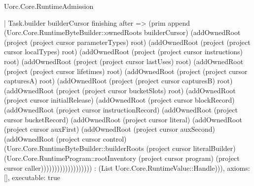 \begin{lexlean}{Uorc.Core.RuntimeAdmission}
\begin{semanticmodule}
{    | Task.builder builderCursor finishing after => (prim append (Uorc.Core.RuntimeByteBuilder::ownedRoots builderCursor) (addOwnedRoot (project (project cursor parameterTypes) root) (addOwnedRoot (project (project cursor localTypes) root) (addOwnedRoot (project (project cursor instructions) root) (addOwnedRoot (project (project cursor lastUses) root) (addOwnedRoot (project (project cursor lifetimes) root) (addOwnedRoot (project (project cursor capturesA) root) (addOwnedRoot (project (project cursor capturesB) root) (addOwnedRoot (project (project cursor bucketSlots) root) (addOwnedRoot (project cursor initialRelease) (addOwnedRoot (project cursor blockRecord) (addOwnedRoot (project cursor instructionRecord) (addOwnedRoot (project cursor bucketRecord) (addOwnedRoot (project cursor literal) (addOwnedRoot (project cursor auxFirst) (addOwnedRoot (project cursor auxSecond) (addOwnedRoot (project cursor control) (Uorc.Core.RuntimeByteBuilder::builderRoots (project cursor literalBuilder) (Uorc.Core.RuntimeProgram::rootInventory (project cursor program) (project cursor caller))))))))))))))))))) : (List Uorc.Core.RuntimeValue::Handle))),
  axioms: [],
  executable: true
}


\end{semanticmodule}
\end{lexlean}

